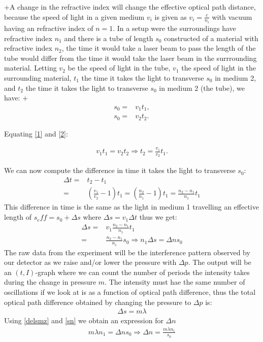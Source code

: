 +A change in the refractive index will change the effective optical path distance, because the speed of light in a given medium $v_i$ is given as $v_i=\frac{c}{n_i}$ with vacuum having an refractive index of $n=1$. In a setup were the surroundings have refractive index $n_1$ and there is a tube of length $s_0$ constructed of a material with refractive index $n_2$, the time it would take a laser beam to pass the length of the tube would differ from the time it would take the laser beam in the surrrounding material. Letting $v_2$ be the speed of light in the tube, $v_1$ the speed of light in the surrounding material, $t_1$ the time it takes the light to transverse $s_0$ in medium 2, and $t_2$ the time it takes the light to transverse $s_0$ in medium 2 (the tube), we have:
+
\begin{align}
    s_0 = & v_1 t_1,
\label{1}\\
    s_0 = & v_2 t_2.
\label{2}
\end{align}

Equating \ref{1} and \ref{2}:

\begin{align}
    v_1 t_1 = v_2 t_2 \Rightarrow t_2 = \frac{v_1}{v_2}t_1.
\label{t2}
\end{align}

We can now compute the difference in time it takes the light to transverse $s_0$:
%
\begin{align}
\Delta t = &  t_2-t_1 \\
= & (\frac{v_1}{v_2}-1)t_1
=  (\frac{n_2}{n_1}-1)t_1 
= \frac{n_2-n_1}{n_1}t_1
\label{deltat}
\end{align}
%
This difference in time is the same as the light in medium 1 travelling an effective length of $s_eff=s_0+\Delta s$ where $\Delta s = v_1 \Delta t$ thus we get:
%
\begin{align}
\Delta s = & v_1\frac{n_2-n_1}{n_1}t_1\\
= & \frac{n_2-n_1}{n_1}s_0 \Rightarrow n_1\Delta s = \Delta n s_0
\label{sn}
\end{align}
%
The raw data from the experiment will be the interference pattern observed by our detector as we raise and/or lower the pressure with $\Delta p$. The output will be an $(t,I)$-graph where we can count the number of periods the intensity takes during the change in pressure $m$. The intensity must hae the same number of oscillations if we look at is as a function of optical path difference, thus the total optical path difference obtained by changing the pressure to $\Delta p$ is:
%
\begin{align}
\Delta s = m\lambda
\label{delsmz}
\end{align}
%
Using \ref{delsmz} and \ref{sn} we obtain an expression for $\Delta n$
%
\begin{align}
m\lambda n_1 = \Delta n s_0 \Rightarrow \Delta n = \frac{m \lambda n_1}{s_0}
\label{deln}
\end{align}


